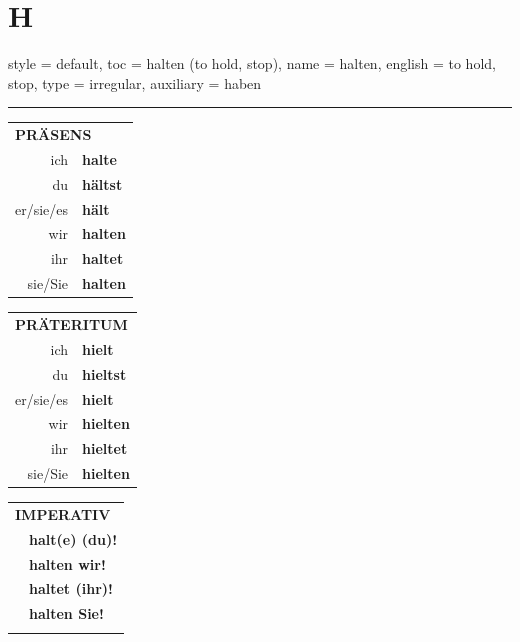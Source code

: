 \section{H}

\begin{verbentry}{
  style = {default},
  toc = {halten (to hold, stop)},
  name = {halten},
  english = {to hold, stop},
  type = {irregular},
  auxiliary = {haben}
}
 
    
     \vspace{5pt}

    \hrule
    
    \vspace{5pt}

  \begin{tabular}{rl}
     \multicolumn{2}{l}{\textbf{PRÄSENS} }\\
    ich & \textbf{halte}\\
    du & \textbf{hältst}\\
    er/sie/es & \textbf{hält}\\
    wir & \textbf{halten}\\
    ihr & \textbf{haltet}\\
    sie/Sie & \textbf{halten}\\
  \end{tabular}
  \hfill
     \begin{tabular}{rl}
    \multicolumn{2}{l}{\textbf{PRÄTERITUM} }\\
    ich & \textbf{hielt}\\
    du & \textbf{hieltst}\\
    er/sie/es & \textbf{hielt}\\
    wir & \textbf{hielten}\\
    ihr & \textbf{hieltet}\\
    sie/Sie & \textbf{hielten}\\
  \end{tabular}
  \hfill
  \begin{tabular}{rl}
     \multicolumn{2}{l}{\textbf{IMPERATIV} }\\
   & \textbf{halt(e) (du)!}\\
   & \textbf{halten wir!}\\
   & \textbf{haltet (ihr)!}\\
   & \textbf{halten Sie!}\\
   & \vspace{10pt}
  \end{tabular}

    \vspace{10pt}


\end{verbentry}

